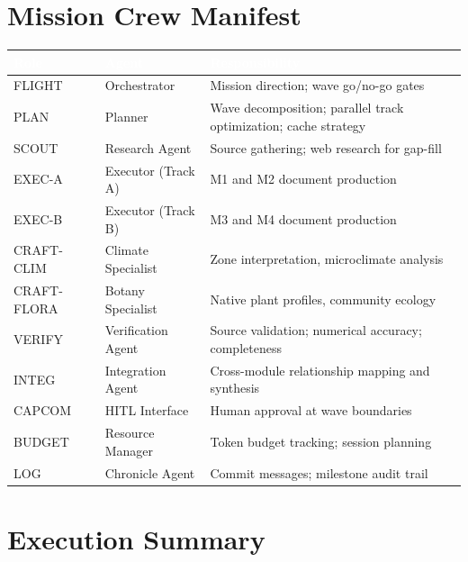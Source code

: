 \documentclass[11pt,letterpaper]{article}
\newcommand{\tableheader}[1]{\textbf{\sffamily\textcolor{white}{#1}}}
\begin{document}
\section{Mission Crew Manifest}

\begin{center}
\begin{tabularx}{\textwidth}{L{2cm}L{3cm}X}
\toprule
{}
\tableheader{Role} & \tableheader{Agent} & \tableheader{Responsibility} \\
\midrule
FLIGHT & Orchestrator & Mission direction; wave go/no-go gates \\
PLAN & Planner & Wave decomposition; parallel track optimization; cache strategy \\
SCOUT & Research Agent & Source gathering; web research for gap-fill \\
EXEC-A & Executor (Track A) & M1 and M2 document production \\
EXEC-B & Executor (Track B) & M3 and M4 document production \\
CRAFT-CLIM & Climate Specialist & Zone interpretation, microclimate analysis \\
CRAFT-FLORA & Botany Specialist & Native plant profiles, community ecology \\
VERIFY & Verification Agent & Source validation; numerical accuracy; completeness \\
INTEG & Integration Agent & Cross-module relationship mapping and synthesis \\
CAPCOM & HITL Interface & Human approval at wave boundaries \\
BUDGET & Resource Manager & Token budget tracking; session planning \\
LOG & Chronicle Agent & Commit messages; milestone audit trail \\
\bottomrule
\end{tabularx}
\end{center}

\section{Execution Summary}
\end{document}
